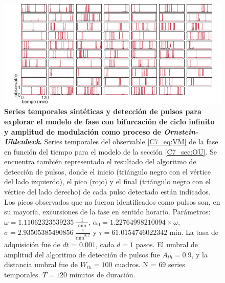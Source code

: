 \documentclass[./main.tex]{subfiles}
\begin{document}
\begin{subappendices}
\begin{figure}
    \centering
    \includegraphics[width=1\columnwidth]{figures/chapter7/C7_OU_traces_for_evaluation_VM.pdf} 
    \caption{\textbf{Series temporales sintéticas y detección de pulsos para explorar el modelo de fase con bifurcación de ciclo infinito y amplitud de modulación como proceso de \textit{Ornstein-Uhlenbeck}.} Series temporales del observable \ref{C7_eq:VM} de la fase en función del tiempo para el modelo de la sección \ref{C7_sec:OU}. Se encuentra también representado el resultado del algoritmo de detección de pulsos, donde el inicio (triángulo negro con el vértice del lado izquierdo), el pico (rojo) y el final (triángulo negro con el vértice del lado derecho) de cada pulso detectado están indicados. Los picos observados que no fueron identificados como pulsos son, en su mayoría, excursiones de la fase en sentido horario. Parámetros: $\omega = 1.11062323539235\; \frac{1}{\text{ min }}$, $\alpha_0 = 1.22764998210094 \times \omega$, $ \sigma = 2.93505385490856 \; \frac{1}{\text{min}^{3/2}}$ y $\tau = 61.0154746022342 \; \text{min} $. La tasa de adquisición fue de $dt$ = $0.001$, cada $d = 1$ pasos. El umbral de amplitud del algoritmo de detección de pulsos fue $A_{th} = 0.9$, y la distancia umbral fue de $W_{th} = 100\text{ cuadros}$. N = $69$ series temporales. $T = 120$ minutos de duración.}
    \label{C7_fig:OU_traces_VM}
\end{figure}


\end{subappendices}
\end{document}
